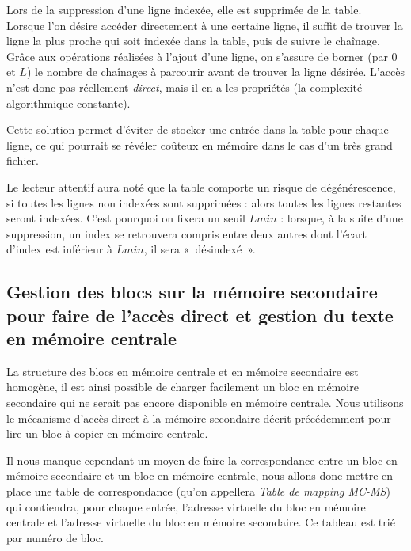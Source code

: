 Lors de la suppression d'une ligne indexée, elle est supprimée de la table.\\

Lorsque l'on désire accéder directement à une certaine ligne, il suffit de trouver la ligne la plus proche qui soit indexée dans la table, puis de suivre le chaînage. Grâce aux opérations réalisées à l'ajout d'une ligne, on s'assure de borner (par $0$ et $L$) le nombre de chaînages à parcourir avant de trouver la ligne désirée. L'accès n'est donc pas réellement \emph{direct}, mais il en a les propriétés (la complexité algorithmique constante).

Cette solution permet d'éviter de stocker une entrée dans la table pour chaque ligne, ce qui pourrait se révéler coûteux en mémoire dans le cas d'un très grand fichier. 

Le lecteur attentif aura noté que la table comporte un risque de dégénérescence, si toutes les lignes non indexées sont supprimées : alors toutes les lignes restantes seront indexées. C'est pourquoi on fixera un seuil $Lmin$ : lorsque, à la suite d'une suppression, un index se retrouvera compris entre deux autres dont l'écart d'index est inférieur à $Lmin$, il sera «~désindexé~». 


\subsection{Gestion des blocs sur la mémoire secondaire pour faire de l'accès
    direct et gestion du texte en mémoire centrale}
	\label{subsec:gestionblocs}

La structure des blocs en mémoire centrale et en mémoire secondaire est
homogène, il est ainsi possible de charger facilement un bloc en mémoire
secondaire qui ne serait pas encore disponible en mémoire centrale. Nous
utilisons le mécanisme d'accès direct à la mémoire secondaire décrit
précédemment pour lire un bloc à copier en mémoire centrale.

Il nous manque cependant un moyen de faire la correspondance entre un bloc en
mémoire secondaire et un bloc en mémoire centrale, nous allons donc mettre en
place une table de correspondance (qu'on appellera \emph{Table de mapping MC-MS})
qui contiendra, pour chaque entrée, l'adresse virtuelle du bloc en mémoire
centrale et l'adresse virtuelle du bloc en mémoire secondaire. Ce tableau est
trié par numéro de bloc.

